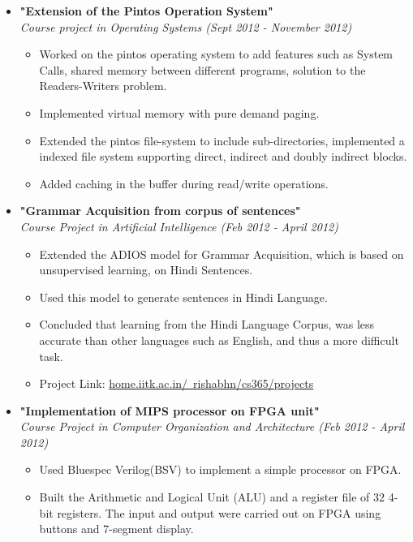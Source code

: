\documentclass[margin,line]{resume}
\begin{document}
\begin{resume}
\begin{itemize}
  \item \large{\textbf{\textsf{"Extension of the Pintos Operation System"}}}
    \\ \small{\textit{Course project in Operating Systems (Sept 2012 - November 2012)}}
    \normalsize
    \begin{itemize}
    \item Worked on the pintos operating system to add features such as System Calls, shared memory between different programs, solution to the Readers-Writers problem.
    \item Implemented virtual memory with pure demand paging.
    \item Extended the pintos file-system to include sub-directories, implemented a indexed file system supporting direct, indirect and doubly indirect blocks.
    \item Added caching in the buffer during read/write operations.
    \end{itemize}

  \item \large{\textbf{\textsf{"Grammar Acquisition from corpus of sentences"}}}
    \\ \small{\textit{Course Project in Artificial Intelligence (Feb 2012 - April 2012)}}
    \normalsize
    \begin{itemize}
    \item Extended the ADIOS model for Grammar Acquisition, which is based on unsupervised learning, on Hindi Sentences.
    \item Used this model to generate sentences in Hindi Language.
    \item Concluded that learning from the Hindi Language Corpus, was less accurate than other languages such as English, and thus a more difficult task.
    \item Project Link: \href{http://home.iitk.ac.in/~rishabhn/cs365/projects}{home.iitk.ac.in/~rishabhn/cs365/projects}
    \end{itemize}


  \item \large{\textbf{\textsf{"Implementation of MIPS processor on FPGA unit"}}}
    \\ \small{\textit{Course Project in Computer Organization and Architecture (Feb 2012 - April 2012)}}
    \normalsize
    \begin{itemize}
    \item Used Bluespec Verilog(BSV) to implement a simple processor on FPGA.
    \item Built the Arithmetic and Logical Unit (ALU) and a register file of 32 4-bit registers. The input and output were carried out on FPGA using buttons and 7-segment display.  
    \end{itemize}


\end{itemize}
\end{resume}
\end{document}
